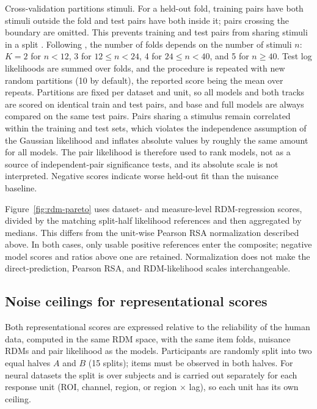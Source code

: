 Cross-validation partitions stimuli. For a held-out fold, training pairs have both stimuli outside the fold and test pairs have both inside it; pairs crossing the boundary are omitted. This prevents training and test pairs from sharing stimuli in a split \citep{schutt2023statistical}. Following \citet{schutt2023statistical}, the number of folds depends on the number of stimuli $n$: $K=2$ for $n<12$, 3 for $12\le n<24$, 4 for $24\le n<40$, and 5 for $n\ge 40$. Test log likelihoods are summed over folds, and the procedure is repeated with new random partitions (10 by default), the reported score being the mean over repeats. Partitions are fixed per dataset and unit, so all models and both tracks are scored on identical train and test pairs, and base and full models are always compared on the same test pairs. Pairs sharing a stimulus remain correlated within the training and test sets, which violates the independence assumption of the Gaussian likelihood and inflates absolute values by roughly the same amount for all models. The pair likelihood is therefore used to rank models, not as a source of independent-pair significance tests, and its absolute scale is not interpreted. Negative scores indicate worse held-out fit than the nuisance baseline.

Figure~\ref{fig:rdm-pareto} uses dataset- and measure-level RDM-regression scores, divided by the matching split-half likelihood references and then aggregated by medians. This differs from the unit-wise Pearson RSA normalization described above. In both cases, only usable positive references enter the composite; negative model scores and ratios above one are retained. Normalization does not make the direct-prediction, Pearson RSA, and RDM-likelihood scales interchangeable.

\subsection{Noise ceilings for representational scores}
\label{app:rsa-ceilings}

Both representational scores are expressed relative to the reliability of the human data, computed in the same RDM space, with the same item folds, nuisance RDMs and pair likelihood as the models. Participants are randomly split into two equal halves $A$ and $B$ (15 splits); items must be observed in both halves. For neural datasets the split is over subjects and is carried out separately for each response unit (ROI, channel, region, or region $\times$ lag), so each unit has its own ceiling.

